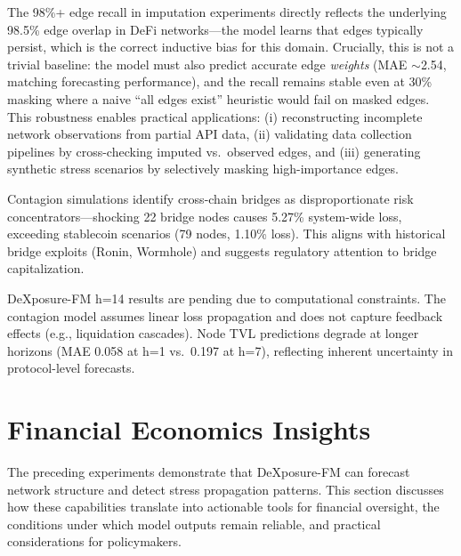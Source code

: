 \documentclass[preprint,12pt]{elsarticle}
\renewcommand{\paragraph}[1]{}
\begin{document}
\paragraph{Imputation recall reflects network stability.}
The 98\%+ edge recall in imputation experiments directly reflects the underlying 98.5\% edge overlap in DeFi networks---the model learns that edges typically persist, which is the correct inductive bias for this domain. Crucially, this is not a trivial baseline: the model must also predict accurate edge \textit{weights} (MAE $\sim$2.54, matching forecasting performance), and the recall remains stable even at 30\% masking where a naive ``all edges exist'' heuristic would fail on masked edges. This robustness enables practical applications: (i) reconstructing incomplete network observations from partial API data, (ii) validating data collection pipelines by cross-checking imputed vs.\ observed edges, and (iii) generating synthetic stress scenarios by selectively masking high-importance edges.

\paragraph{Bridge protocols as systemic risk vectors.}
Contagion simulations identify cross-chain bridges as disproportionate risk concentrators---shocking 22 bridge nodes causes 5.27\% system-wide loss, exceeding stablecoin scenarios (79 nodes, 1.10\% loss). This aligns with historical bridge exploits (Ronin, Wormhole) and suggests regulatory attention to bridge capitalization.

\paragraph{Limitations.}
DeXposure-FM h=14 results are pending due to computational constraints. The contagion model assumes linear loss propagation and does not capture feedback effects (e.g., liquidation cascades). Node TVL predictions degrade at longer horizons (MAE 0.058 at h=1 vs.\ 0.197 at h=7), reflecting inherent uncertainty in protocol-level forecasts.
 \section{Financial Economics Insights}
\label{sec:econ}

The preceding experiments demonstrate that DeXposure-FM can forecast network structure and detect stress propagation patterns. This section discusses how these capabilities translate into actionable tools for financial oversight, the conditions under which model outputs remain reliable, and practical considerations for policymakers.
\end{document}
